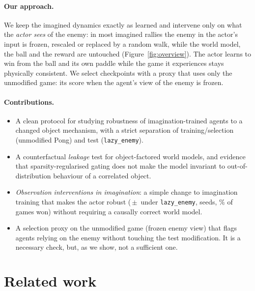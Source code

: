 \documentclass{article}
\newcommand{\lazy}{\texttt{lazy\_enemy}}
\begin{document}
\paragraph{Our approach.} We keep the imagined dynamics exactly as learned and intervene only on
what the \emph{actor sees} of the enemy: in most imagined rallies the enemy in the actor's input is
frozen, rescaled or replaced by a random walk, while the world model, the ball and the reward are
untouched (Figure~\ref{fig:overview}). The actor learns to win from the ball and its own paddle
while the game it experiences stays physically consistent. We select checkpoints with a proxy that
uses only the unmodified game: its score when the agent's view of the enemy is frozen.

\paragraph{Contributions.}
\begin{itemize}[leftmargin=*,itemsep=1pt,topsep=2pt]
  \item A clean protocol for studying robustness of imagination-trained agents to a changed object
        mechanism, with a strict separation of training/selection (unmodified Pong) and test
        (\lazy{}).
  \item A counterfactual \emph{leakage} test for object-factored world models, and evidence that
        sparsity-regularised gating does not make the model invariant to out-of-distribution
        behaviour of a correlated object.
  \item \emph{Observation interventions in imagination}: a simple change to imagination training that
        makes the actor robust (\OursLazy{}\,$\pm$\,\OursLazyStd{} under \lazy{}, \OursSeeds{} seeds,
        \OursWon\% of games won) without requiring a causally correct world model.
  \item A selection proxy on the unmodified game (frozen enemy view) that flags agents relying on
        the enemy without touching the test modification. It is a necessary check, but, as we show, not a
        sufficient one.
\end{itemize}

\section{Related work}
\label{sec:related}
\end{document}
